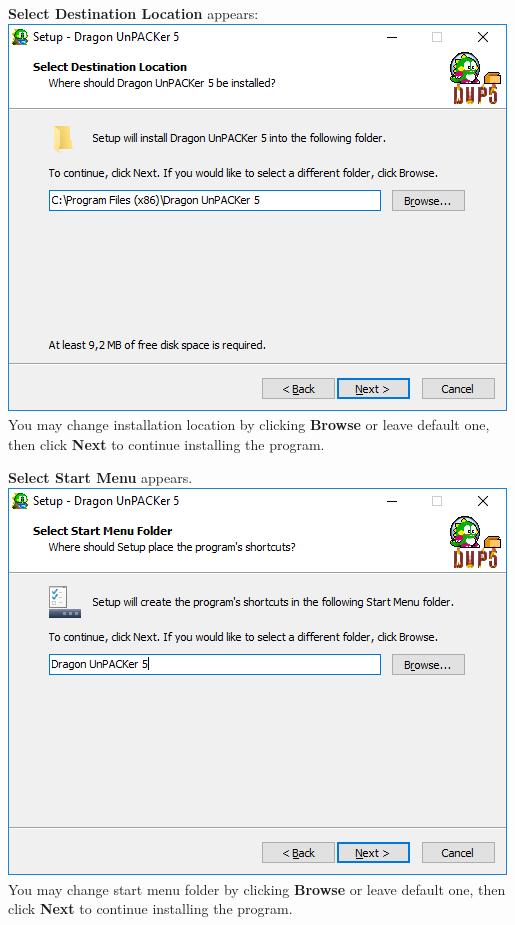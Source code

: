 \documentclass[10pt,a4paper,twoside]{book}
\makeatletter
\def\maxwidth#1{\ifdim\Gin@nat@width>#1 #1\else\Gin@nat@width\fi}
\makeatother
\begin{document}
\begin{enumerate}
\begin{minipage}{\linewidth}
\item \textbf{Select Destination Location} appears:\\
\includegraphics[width=\maxwidth{9cm}]{install/005-destination}\\
You may change installation location by clicking \textbf{Browse} or leave default one, then click \textbf{Next} to continue installing the program.
\end{minipage}

\begin{minipage}{\linewidth}
\item \textbf{Select Start Menu} appears.\\
\includegraphics[width=\maxwidth{9cm}]{install/006-menu}\\
You may change start menu folder by clicking \textbf{Browse} or leave default one, then click \textbf{Next} to continue installing the program.
\end{minipage}


\end{enumerate}
\end{document}
